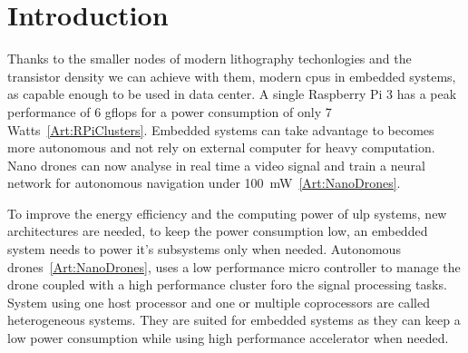 
\chapter{Introduction}

	Thanks to the smaller nodes of modern lithography techonlogies and the transistor density we can achieve with them, modern \glspl{cpu} in embedded systems, as capable enough to be used in data center. A single Raspberry Pi 3 has a peak performance of 6 \glspl{gflop} for a power consumption of only 7 Watts~\ref{Art:RPiClusters}.
	Embedded systems can take advantage to becomes more autonomous and not rely on external computer for heavy computation. Nano drones can now analyse in real time a video signal and train a neural network for autonomous navigation under \si{100 mW}~\ref{Art:NanoDrones}.

    To improve the energy efficiency and the computing power of \gls{ulp} systems, new architectures are needed, to keep the power consumption low, an embedded system needs to power it's subsystems only when needed. Autonomous drones~\ref{Art:NanoDrones}, uses a low performance micro controller to manage the drone coupled with a high performance cluster foro the signal processing tasks. System using one host processor and one or multiple coprocessors are called heterogeneous systems. They are suited for embedded systems as they can keep a low power consumption while using high performance accelerator when needed.

